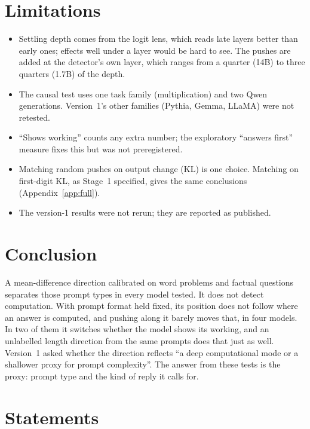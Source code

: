 \documentclass[11pt]{article}
\begin{document}
\section{Limitations}

\begin{itemize}
  \item Settling depth comes from the logit lens, which reads late layers better than early ones; effects well under a layer would be hard to see. The pushes are added at the detector's own layer, which ranges from a quarter (14B) to three quarters (1.7B) of the depth.
  \item The causal test uses one task family (multiplication) and two Qwen generations. Version~1's other families (Pythia, Gemma, LLaMA) were not retested.
  \item ``Shows working'' counts any extra number; the exploratory ``answers first'' measure fixes this but was not preregistered.
  \item Matching random pushes on output change (KL) is one choice. Matching on first-digit KL, as Stage~1 specified, gives the same conclusions (Appendix~\ref{app:full}).
  \item The version-1 results were not rerun; they are reported as published.
\end{itemize}

\section{Conclusion}

A mean-difference direction calibrated on word problems and factual questions separates those prompt types in every model tested. It does not detect computation. With prompt format held fixed, its position does not follow where an answer is computed, and pushing along it barely moves that, in four models. In two of them it switches whether the model shows its working, and an unlabelled length direction from the same prompts does that just as well. Version~1 asked whether the direction reflects ``a deep computational mode or a shallower proxy for prompt complexity''. The answer from these tests is the proxy: prompt type and the kind of reply it calls for.

\section*{Statements}
\end{document}
